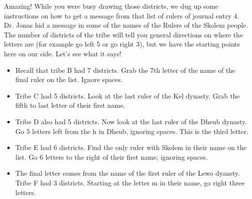 Amazing!
While you were busy drawing those districts, we dug up some instructions on how to get a message from that list of rulers of journal entry 4.
Dr. Jonas hid a message in some of the names of the Rulers of the Skolem people.
The number of districts of the tribe will tell you general directions on where the letters are (for example go left 5 or go right 3), but we have the starting points here on our side.
Let's see what it says!

\begin{itemize}
\item Recall that tribe B had 7 districts. Grab the 7th letter of the name of the final ruler on the list. Ignore spaces.
\item Tribe C had 5 districts. Look at the last ruler of the Kel dynasty. Grab the fifth to last letter of their first name.
\item Tribe D also had 5 districts. Now look at the last ruler of the Dheub dynasty. Go 5 letters left from the h in Dheub, ignoring spaces. This is the third letter.
\item Tribe E had 6 districts. Find the only ruler with Skolem in their name on the list. Go 6 letters to the right of their first name, ignoring spaces.
\item The final letter comes from the name of the first ruler of the Lewo dyansty. Tribe F had 3 districts. Starting at the letter m in their name, go right three letters.
\end{itemize}